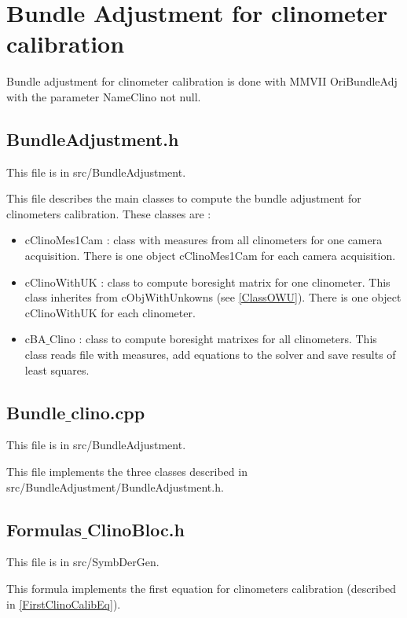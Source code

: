 \chapter{Bundle Adjustment for clinometer calibration}



Bundle adjustment for clinometer calibration is done with MMVII OriBundleAdj with the parameter NameClino not null.

\section{BundleAdjustment.h}

This file is in src/BundleAdjustment.

This file describes the main classes to compute the bundle adjustment for clinometers calibration. These classes are :
\begin{itemize}
    \item cClinoMes1Cam : class with measures from all clinometers for one camera acquisition. There is one object cClinoMes1Cam for each camera acquisition.
    \item cClinoWithUK : class to compute boresight matrix for one clinometer. This class inherites from cObjWithUnkowns (see \ref{ClassOWU}). 
    There is one object cClinoWithUK for each clinometer.
    \item cBA$\_$Clino : class to compute boresight matrixes for all clinometers. This class reads file with measures, add equations to the solver and save results of least squares.
\end{itemize}

\section{Bundle$\_$clino.cpp}

This file is in src/BundleAdjustment.

This file implements the three classes described in src/BundleAdjustment/BundleAdjustment.h.


\section{Formulas$\_$ClinoBloc.h}

This file is in src/SymbDerGen.

This formula implements the first equation for clinometers calibration (described in \ref{FirstClinoCalibEq}).


